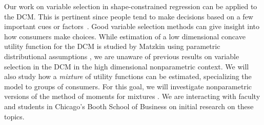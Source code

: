 Our work on variable selection in shape-constrained regression can be
applied to the DCM.  This is pertinent since people tend to make
decisions based on a few important cues or
factors~\citep{shah2008heuristics}. Good variable selection methods
can give insight into how consumers make choices.  While estimation of
a low dimensional concave utility function for the DCM is studied by
Matzkin using parametric distributional assumptions
\citep{matzkin1991semiparametric}, we are unaware of previous results
on variable selection in the DCM in the high dimensional nonparametric
context.   We will also study how a \textit{mixture} of
utility functions can be estimated, specializing the model
to groups of consumers.  For this goal, we
will investigate nonparametric versions
of the method of moments 
for mixtures \citep{icml_liang,anima_colt}.  We are interacting
with faculty and students in Chicago's Booth School of Business
on initial research on these topics.




